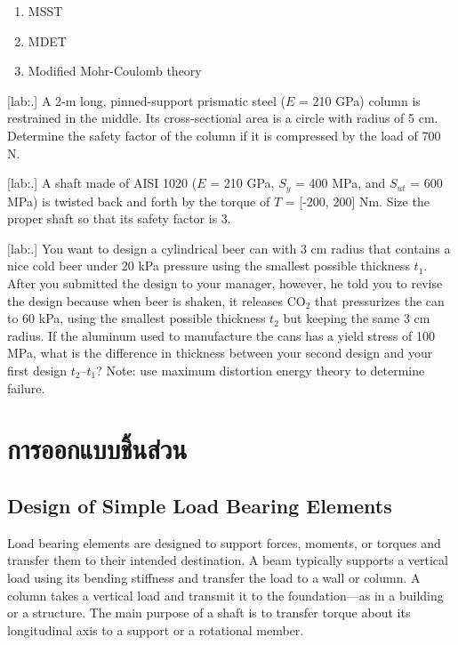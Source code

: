 \documentclass[a4paper,openany,12pt]{book}
\begin{document}
{{\begin{enumerate}
\item MSST

\item MDET

\item Modified Mohr-Coulomb theory
\end{enumerate}


[lab:.] A 2-m long, pinned-support
prismatic steel (\(E\) = 210 GPa) column is restrained in the middle. Its
cross-sectional area is a circle with radius of 5 cm. Determine the
safety factor of the column if it is compressed by the load of 700 N.


[lab:.] A shaft made of AISI 1020
(\(E\) = 210 GPa, \(S_y\) = 400 MPa, and \(S_{ut}\) = 600 MPa) is twisted back
and forth by the torque of \(T\) = [-200, 200] Nm. Size the proper shaft
so that its safety factor is 3.


[lab:.] You want to design a
cylindrical beer can with 3 cm radius that contains a nice cold beer
under 20 kPa pressure using the smallest possible thickness \(t_1\). After
you submitted the design to your manager, however, he told you to revise
the design because when beer is shaken, it releases \(\text{CO}_2\) that
pressurizes the can to 60 kPa, using the smallest possible thickness
\(t_2\) but keeping the same 3 cm radius. If the aluminum used to
manufacture the cans has a yield stress of 100 MPa, what is the
difference in thickness between your second design and your first design
\(t_2 – t_1\)? Note: use maximum distortion energy theory to determine
failure.


\part{การออกแบบชิ้นส่วน}
\label{the-components}
\chapter{Design of Simple Load Bearing Elements}
\label{design-of-simple-load-bearing-elements}
Load bearing elements are designed to support forces, moments, or
torques and transfer them to their intended destination. A beam
typically supports a vertical load using its bending stiffness and
transfer the load to a wall or column. A column takes a vertical load
and transmit it to the foundation---as in a building or a structure. The
main purpose of a shaft is to transfer torque about its longitudinal
axis to a support or a rotational member.

}}
\end{document}
